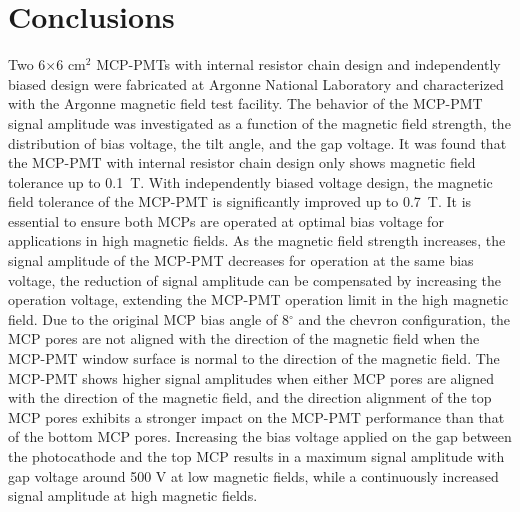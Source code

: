 \documentclass[preprint,5p]{elsarticle}
\begin{document}
\section{Conclusions}
Two 6$\times$6 cm$^2$ MCP-PMTs with internal resistor chain design and 
independently biased design were fabricated at Argonne National Laboratory and 
characterized with the Argonne magnetic field test facility. The behavior of 
the MCP-PMT signal amplitude was investigated as a function of the magnetic 
field strength, the distribution of bias voltage, the tilt angle, and the gap 
voltage. It was found that the MCP-PMT with internal resistor chain design only 
shows magnetic field tolerance up to 0.1~T. With independently biased voltage 
design, the magnetic field tolerance of the MCP-PMT is significantly improved 
up to 0.7~T. It is essential to ensure both MCPs are operated at optimal bias 
voltage for applications in high magnetic fields. As the magnetic field 
strength increases, the signal amplitude of the MCP-PMT decreases for operation 
at the same bias voltage, the reduction of signal amplitude can be compensated 
by increasing the operation voltage, extending the MCP-PMT operation limit in 
the high magnetic field. Due to the original MCP bias angle of 8$^{\circ}$ and 
the chevron configuration, the MCP pores are not aligned with the direction of 
the magnetic field when the MCP-PMT window surface is normal to the direction 
of the magnetic field. The MCP-PMT shows higher signal amplitudes when either 
MCP pores are aligned with the direction of the magnetic field, and the 
direction alignment of the top MCP pores exhibits a stronger impact on the 
MCP-PMT performance than that of the bottom MCP pores.  Increasing the bias 
voltage applied on the gap between the photocathode and the top MCP results in 
a maximum signal amplitude with gap voltage around 500 V at low magnetic 
fields, while a continuously increased signal amplitude at high magnetic 
fields. 

  
\end{document}
